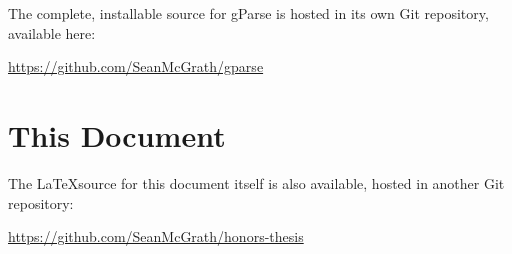 The complete, installable source for gParse is hosted in its own Git repository, available here:

\bigskip
\href{https://github.com/SeanMcGrath/gparse}{https://github.com/SeanMcGrath/gparse}

\section{This Document}

The \LaTeX source for this document itself is also available, hosted in another Git repository:

\bigskip\href{https://github.com/SeanMcGrath/honors-thesis}{https://github.com/SeanMcGrath/honors-thesis}